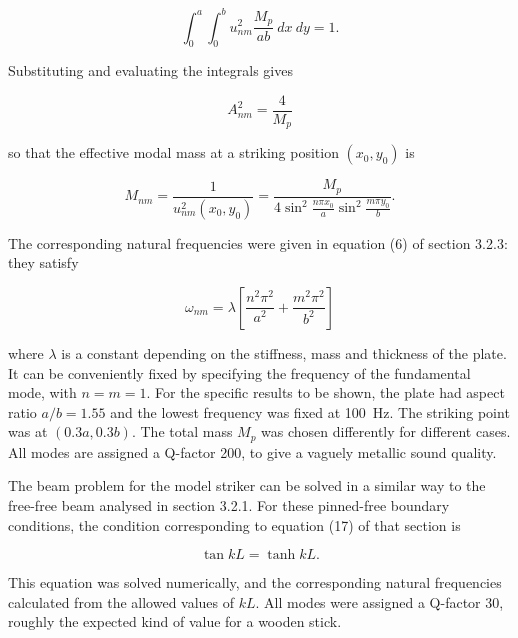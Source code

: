   \begin{equation*}\int_0^a{\int_0^b{ u^2_{nm} \dfrac{M_p}{ab}~dx~dy}}=1 . 
  \tag{7}\end{equation*} 

  Substituting and evaluating the integrals gives 

  \begin{equation*}A^2_{nm}=\dfrac{4}{M_p} \tag{8}\end{equation*} 

  \noindent{}so that the effective modal mass at a striking position 
  $(x_0,y_0)$ is 

  \begin{equation*}M_{nm}=\dfrac{1}{u^2_{nm}(x_0,y_0)}=\dfrac{M_p}{4 \sin^2 
  \frac{n \pi x_0}{a} \sin^2 \frac{m \pi y_0}{b}} . \tag{9}\end{equation*} 

  The corresponding natural frequencies were given in equation (6) of section 
  3.2.3: they satisfy 

  \begin{equation*}\omega_{nm} = \lambda \left[\frac{n^2 \pi^2}{a^2}+\frac{m^2 
  \pi^2}{b^2} \right] \tag{10}\end{equation*} 

  \noindent{}where $\lambda$ is a constant depending on the stiffness, mass and 
  thickness of the plate. It can be conveniently fixed by specifying the 
  frequency of the fundamental mode, with $n=m=1$. For the specific results to 
  be shown, the plate had aspect ratio $a/b = 1.55$ and the lowest frequency 
  was fixed at 100~Hz. The striking point was at $(0.3a,0.3b)$. The total mass 
  $M_p$ was chosen differently for different cases. All modes are assigned a 
  Q-factor 200, to give a vaguely metallic sound quality. 

  The beam problem for the model striker can be solved in a similar way to the 
  free-free beam analysed in section 3.2.1. For these pinned-free boundary 
  conditions, the condition corresponding to equation (17) of that section is 

  \begin{equation*}\tan kL = \tanh kL . \tag{11}\end{equation*} 

  This equation was solved numerically, and the corresponding natural 
  frequencies calculated from the allowed values of $kL$. All modes were 
  assigned a Q-factor 30, roughly the expected kind of value for a wooden 
  stick. 

